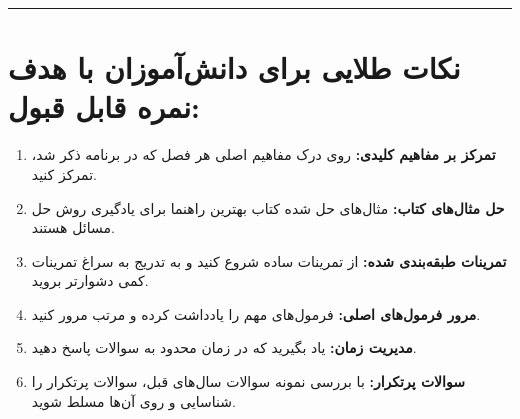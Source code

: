 \documentclass[12pt,a4paper]{article}
\begin{document}
\vspace{1em}
\rule{\linewidth}{0.4pt}\vspace{1em}

\section*{نکات طلایی برای دانش‌آموزان با هدف نمره قابل قبول:}
\begin{enumerate}[label=\arabic*., itemsep=0.2em, topsep=0.3em]
    \item \textbf{تمرکز بر مفاهیم کلیدی:} روی درک مفاهیم اصلی هر فصل که در برنامه ذکر شد، تمرکز کنید.
    \item \textbf{حل مثال‌های کتاب:} مثال‌های حل شده کتاب بهترین راهنما برای یادگیری روش حل مسائل هستند.
    \item \textbf{تمرینات طبقه‌بندی شده:} از تمرینات ساده شروع کنید و به تدریج به سراغ تمرینات کمی دشوارتر بروید.
    \item \textbf{مرور فرمول‌های اصلی:} فرمول‌های مهم را یادداشت کرده و مرتب مرور کنید.
    \item \textbf{مدیریت زمان:} یاد بگیرید که در زمان محدود به سوالات پاسخ دهید.
    \item \textbf{سوالات پرتکرار:} با بررسی نمونه سوالات سال‌های قبل، سوالات پرتکرار را شناسایی و روی آن‌ها مسلط شوید.
\end{enumerate}
\end{document}
